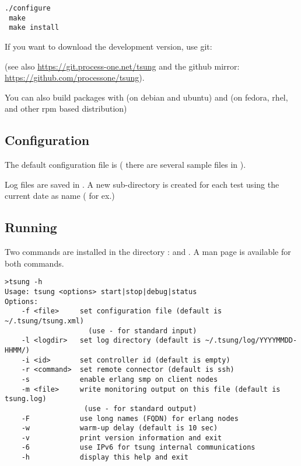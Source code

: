\documentclass{TSUNG-en}
\begin{document}
\begin{Verbatim}
./configure
 make
 make install
\end{Verbatim}

If you want to download the development version, use git:


 (see also \url{https://git.process-one.net/tsung} and the github
 mirror: \url{https://github.com/processone/tsung}).

You can also build packages with  (on debian and
ubuntu) and  (on fedora, rhel, and other rpm based distribution)

\subsection{Configuration}

The default configuration file is  (
there are several sample files in
).

Log files are saved in  . A new sub-directory
is created for each test using the current date as name
( for ex.)

\subsection{Running}

Two commands are installed in the directory :
 and . A man page is available
for both commands.

\begin{Verbatim}
>tsung -h
Usage: tsung <options> start|stop|debug|status
Options:
    -f <file>     set configuration file (default is ~/.tsung/tsung.xml)
                    (use - for standard input)
    -l <logdir>   set log directory (default is ~/.tsung/log/YYYYMMDD-HHMM/)
    -i <id>       set controller id (default is empty)
    -r <command>  set remote connector (default is ssh)
    -s            enable erlang smp on client nodes
    -m <file>     write monitoring output on this file (default is tsung.log)
                   (use - for standard output)
    -F            use long names (FQDN) for erlang nodes
    -w            warm-up delay (default is 10 sec)
    -v            print version information and exit
    -6            use IPv6 for tsung internal communications
    -h            display this help and exit
\end{Verbatim}
\end{document}
